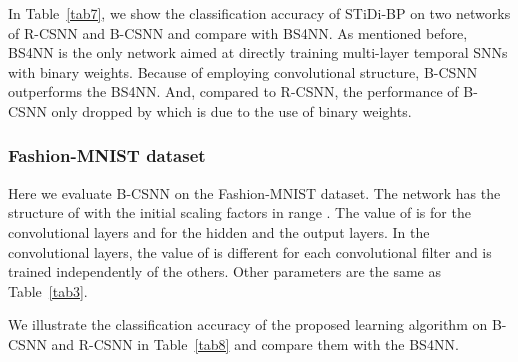 \documentclass[preprint,twocolumn,5p,12pt]{article}
\begin{document}
In Table~\ref{tab7}, we show the classification accuracy of STiDi-BP on two networks of R-CSNN and B-CSNN and compare with BS4NN\cite{R17}. As mentioned before, BS4NN is the only network aimed at directly training multi-layer temporal SNNs with binary weights.
Because of employing convolutional structure, B-CSNN outperforms the BS4NN. And, compared to R-CSNN, the performance of B-CSNN only dropped by  which is due to the use of binary weights.

\begin{table}
\begin{center}

\caption{The classification accuracies of recent binary SNNs with direct training on the MNIST dataset.} \label{tab7}
\end{center}
\end{table}


\subsubsection{Fashion-MNIST dataset}

Here we evaluate B-CSNN on the Fashion-MNIST dataset. The network has the structure of  with the initial scaling factors in range . The value of  is  for the convolutional layers and  for the hidden and the output layers. In the convolutional layers, the value of  is different for each convolutional filter and is trained independently of the others.
Other parameters are the same as Table~\ref{tab3}.

We illustrate the classification accuracy of the proposed learning algorithm on B-CSNN and R-CSNN in Table~\ref{tab8} and compare them with the BS4NN.

\begin{table}
\begin{center}
\caption{The classification accuracies of recent binary SNNs with direct training on the Fashion-MNIST dataset.} \label{tab8}
\end{center}
\end{table}
\end{document}
